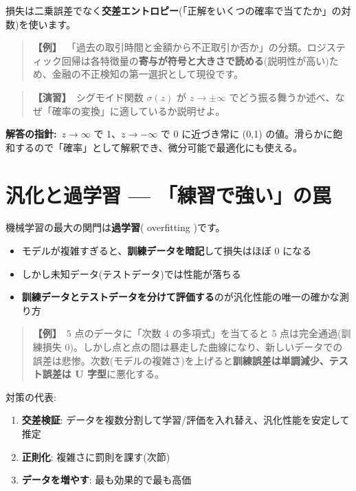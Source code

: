 \documentclass{article}
\begin{document}
損失は二乗誤差でなく\textbf{交差エントロピー}(「正解をいくつの確率で当てたか」の対数)を使います。

\begin{quote}
\textbf{【例】}\ 「過去の取引時間と金額から不正取引か否か」の分類。ロジスティック回帰は各特徴量の\textbf{寄与が符号と大きさで読める}(説明性が高い)ため、金融の不正検知の第一選択として現役です。
\end{quote}

\begin{quote}
\textbf{【演習】}\ シグモイド関数 \(\sigma(z)\) が \(z \to \pm\infty\) でどう振る舞うか述べ、なぜ「確率の変換」に適しているか説明せよ。
\end{quote}

\textbf{解答の指針:}\ \(z \to \infty\) で 1、\(z \to -\infty\) で 0 に近づき常に (0,1) の値。滑らかに飽和するので「確率」として解釈でき、微分可能で最適化にも使える。

\section{汎化と過学習 — 「練習で強い」の罠}

機械学習の最大の関門は\textbf{過学習}( overfitting )です。

\begin{itemize}
\item モデルが複雑すぎると、\textbf{訓練データを暗記}して損失はほぼ 0 になる
\item しかし未知データ(テストデータ)では性能が落ちる
\item \textbf{訓練データとテストデータを分けて評価する}のが汎化性能の唯一の確かな測り方
\end{itemize}

\begin{quote}
\textbf{【例】}\ 5 点のデータに「次数 4 の多項式」を当てると 5 点は完全通過(訓練損失 0)。しかし点と点の間は暴走した曲線になり、新しいデータでの誤差は悲惨。次数(モデルの複雑さ)を上げると\textbf{訓練誤差は単調減少、テスト誤差は U 字型}に悪化する。
\end{quote}

対策の代表:
\begin{enumerate}
\item \textbf{交差検証}: データを複数分割して学習/評価を入れ替え、汎化性能を安定して推定
\item \textbf{正則化}: 複雑さに罰則を課す(次節)
\item \textbf{データを増やす}: 最も効果的で最も高価
\end{enumerate}
\end{document}

